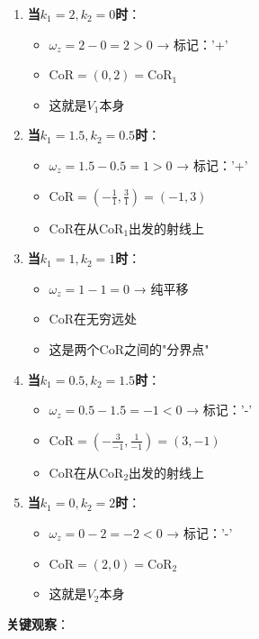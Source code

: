 \documentclass[12pt,a4paper]{article}
\begin{document}
\begin{enumerate}
\item \textbf{当$k_1 = 2, k_2 = 0$时}：
  \begin{itemize}
  \item $\omega_z = 2 - 0 = 2 > 0$ → 标记：'+'
  \item $\text{CoR} = (0, 2) = \text{CoR}_1$
  \item 这就是$V_1$本身
  \end{itemize}

\item \textbf{当$k_1 = 1.5, k_2 = 0.5$时}：
  \begin{itemize}
  \item $\omega_z = 1.5 - 0.5 = 1 > 0$ → 标记：'+'
  \item $\text{CoR} = \left(-\frac{1}{1}, \frac{3}{1}\right) = (-1, 3)$
  \item CoR在从CoR$_1$出发的射线上
  \end{itemize}

\item \textbf{当$k_1 = 1, k_2 = 1$时}：
  \begin{itemize}
  \item $\omega_z = 1 - 1 = 0$ → 纯平移
  \item CoR在无穷远处
  \item 这是两个CoR之间的"分界点"
  \end{itemize}

\item \textbf{当$k_1 = 0.5, k_2 = 1.5$时}：
  \begin{itemize}
  \item $\omega_z = 0.5 - 1.5 = -1 < 0$ → 标记：'-'
  \item $\text{CoR} = \left(-\frac{3}{-1}, \frac{1}{-1}\right) = (3, -1)$
  \item CoR在从CoR$_2$出发的射线上
  \end{itemize}

\item \textbf{当$k_1 = 0, k_2 = 2$时}：
  \begin{itemize}
  \item $\omega_z = 0 - 2 = -2 < 0$ → 标记：'-'
  \item $\text{CoR} = (2, 0) = \text{CoR}_2$
  \item 这就是$V_2$本身
  \end{itemize}
\end{enumerate}

\textbf{关键观察}：
\end{document}
